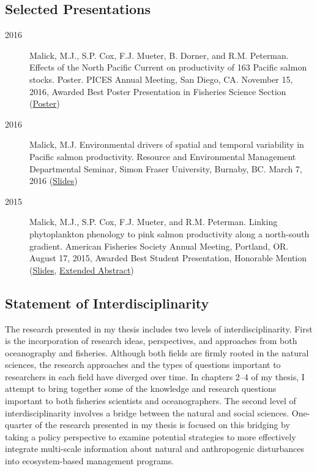 \documentclass[11pt]{report}
\begin{document}
\subsection*{Selected Presentations}
\begin{description}
  \item[2016] Malick, M.J., S.P. Cox, F.J. Mueter, B. Dorner, and R.M. Peterman.
    Effects of the North Pacific Current on productivity of 163 Pacific salmon
    stocks. Poster. PICES Annual Meeting, San Diego, CA. November 15, 2016,
    Awarded Best Poster Presentation in Fisheries Science Section
    (\href{https://s3-us-west-2.amazonaws.com/michaelmalick-com-public/slides/malick_etal_pices2016_poster.pdf}{Poster})

  \item[2016] Malick, M.J. Environmental drivers of spatial and temporal
    variability in Pacific salmon productivity. Resource and Environmental
    Management Departmental Seminar, Simon Fraser University, Burnaby, BC. March
    7, 2016
    (\href{https://s3-us-west-2.amazonaws.com/michaelmalick-com-public/slides/malick_sfu_seminar_2016.pdf}{Slides})

  \item[2015] Malick, M.J., S.P. Cox, F.J. Mueter, and R.M. Peterman. Linking
    phytoplankton phenology to pink salmon productivity along a north-south
    gradient. American Fisheries Society Annual Meeting, Portland, OR. August
    17, 2015, Awarded Best Student Presentation, Honorable Mention
    (\href{https://s3-us-west-2.amazonaws.com/michaelmalick-com-public/slides/malick_etal_afs2015_slides.pdf}{Slides},
    \href{https://s3-us-west-2.amazonaws.com/michaelmalick-com-public/slides/malick_etal_afs2015_extended_abstract.pdf}{Extended Abstract})

\end{description}


\subsection*{Statement of Interdisciplinarity}

The research presented in my thesis includes two levels of interdisciplinarity.
First is the incorporation of research ideas, perspectives, and approaches from
both oceanography and fisheries. Although both fields are firmly rooted in the
natural sciences, the research approaches and the types of questions important
to researchers in each field have diverged over time. In chapters 2--4 of my
thesis, I attempt to bring together some of the knowledge and research questions
important to both fisheries scientists and oceanographers. The second level of
interdisciplinarity involves a bridge between the natural and social sciences.
One-quarter of the research presented in my thesis is focused on this bridging
by taking a policy perspective to examine potential strategies to more
effectively integrate multi-scale information about natural and anthropogenic
disturbances into ecosystem-based management programs.
\end{document}
